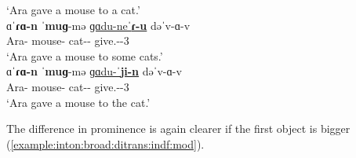 \begin{exe}
\begin{xlist}
		\trans `Ara gave a mouse to a cat.'
		\\ 
		\ex \gll  ɑˈ\textbf{ɾɑ-n}  {ˈ\textbf{muɡ}-mə} \underline{ɡɑdu-neˈ\textbf{ɾ-u}}  dəˈv-ɑ-v \\
		Ara-{} mouse-{\indf} cat-{\pl}-{\dat} give.{\aorperf}-{\pst}-3{\sg}  \\
		\trans `Ara gave a mouse to some cats.'
		\\ 
		\ex \gll  ɑˈ\textbf{ɾɑ-n}  {ˈ\textbf{muɡ}-mə} \underline{ɡɑdu-ˈ\textbf{ji-n}}  dəˈv-ɑ-v \\
		Ara-{} mouse-{\indf} cat-{\dat}-{} give.{\aorperf}-{\pst}-3{\sg}  \\
		\trans `Ara gave a mouse to the cat.'
		\\ 
	\end{xlist}
\end{exe}

The difference in prominence is again clearer if the first object is bigger (\ref{example:inton:broad:ditrans:indf:mod}). 


